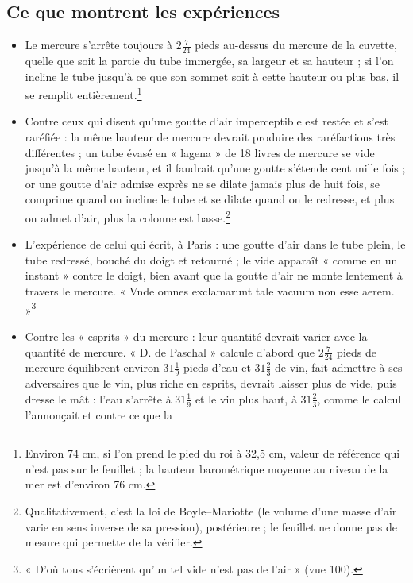\documentclass[11pt,a4paper]{article}
\begin{document}
\subsection*{Ce que montrent les expériences}

\begin{itemize}
  \item Le mercure s'arrête toujours à $2\frac{7}{24}$ pieds au-dessus du mercure
    de la cuvette, quelle que soit la partie du tube immergée, sa largeur et sa
    hauteur ; si l'on incline le tube jusqu'à ce que son sommet soit à cette
    hauteur ou plus bas, il se remplit entièrement.\footnote{Environ 74 cm, si
    l'on prend le pied du roi à 32,5 cm, valeur de référence qui n'est pas sur le
    feuillet ; la hauteur barométrique moyenne au niveau de la mer est d'environ
    76 cm.}
  \item Contre ceux qui disent qu'une goutte d'air imperceptible est restée et
    s'est raréfiée : la même hauteur de mercure devrait produire des
    raréfactions très différentes ; un tube évasé en « lagena » de 18 livres de
    mercure se vide jusqu'à la même hauteur, et il faudrait qu'une goutte
    s'étende cent mille fois ; or une goutte d'air admise exprès ne se dilate
    jamais plus de huit fois, se comprime quand on incline le tube et se dilate
    quand on le redresse, et plus on admet d'air, plus la colonne est
    basse.\footnote{Qualitativement, c'est la loi de Boyle--Mariotte (le volume
    d'une masse d'air varie en sens inverse de sa pression), postérieure ; le
    feuillet ne donne pas de mesure qui permette de la vérifier.}
  \item L'expérience de celui qui écrit, à Paris : une goutte d'air dans le tube
    plein, le tube redressé, bouché du doigt et retourné ; le vide apparaît
    « comme en un instant » contre le doigt, bien avant que la goutte d'air ne
    monte lentement à travers le mercure. « Vnde omnes exclamarunt tale vacuum non
    esse aerem. »\footnote{« D'où tous s'écrièrent qu'un tel vide n'est pas de
    l'air » (vue 100).}
  \item Contre les « esprits » du mercure : leur quantité devrait varier avec la
    quantité de mercure. « D. de Paschal » calcule d'abord que $2\frac{7}{24}$ pieds
    de mercure équilibrent environ $31\frac19$ pieds d'eau et $31\frac23$ de vin,
    fait admettre à ses adversaires que le vin, plus riche en esprits, devrait
    laisser plus de vide, puis dresse le mât : l'eau s'arrête à $31\frac19$ et le
    vin plus haut, à $31\frac23$, comme le calcul l'annonçait et contre ce que la

\end{itemize}
\end{document}
